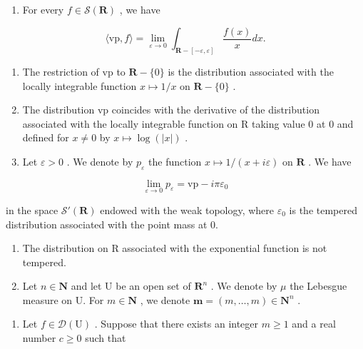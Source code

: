 \begin{enumerate}
\def\labelenumi{\alph{enumi})}
\setcounter{enumi}{1}
\tightlist
\item
  For every \(f \in \mathcal{S}(\mathbf{R})\) , we have
\end{enumerate}

\[
\langle \mathrm{vp}, f \rangle = \lim _ {\varepsilon \rightarrow 0} \int_ {\mathbf {R} - [ - \varepsilon , \varepsilon ]} \frac {f (x)}{x} d x.
\]

\begin{enumerate}
\def\labelenumi{\alph{enumi})}
\setcounter{enumi}{2}
\item
  The restriction of vp to \(\mathbf{R} - \{0\}\) is the distribution associated with the locally integrable function \(x \mapsto 1/x\) on \(\mathbf{R} - \{0\}\) .
\item
  The distribution vp coincides with the derivative of the distribution associated with the locally integrable function on R taking value 0 at 0 and defined for \(x \neq 0\) by \(x \mapsto \log(|x|)\) .
\item
  Let \(\varepsilon > 0\) . We denote by \(p_{\varepsilon}\) the function \(x \mapsto 1 / (x + i\varepsilon)\) on \(\mathbf{R}\) . We have
\end{enumerate}

\[
\lim _ {\varepsilon \to 0} p _ {\varepsilon} = \mathrm{vp} - i \pi \varepsilon_ {0}
\]

in the space \(\mathcal{S}'(\mathbf{R})\) endowed with the weak topology, where \(\varepsilon_0\) is the tempered distribution associated with the point mass at 0.

\begin{enumerate}
\def\labelenumi{\arabic{enumi})}
\setcounter{enumi}{21}
\item
  The distribution on R associated with the exponential function is not tempered.
\item
  Let \(n \in \mathbf{N}\) and let U be an open set of \(\mathbf{R}^n\) . We denote by \(\mu\) the Lebesgue measure on U. For \(m \in \mathbf{N}\) , we denote \(\boldsymbol{m} = (m, \ldots, m) \in \mathbf{N}^n\) .
\end{enumerate}

\begin{enumerate}
\def\labelenumi{\alph{enumi})}
\tightlist
\item
  Let \(f \in \mathcal{D}(\mathrm{U})\) . Suppose that there exists an integer \(m \geqslant 1\) and a real number \(c \geqslant 0\) such that
\end{enumerate}


